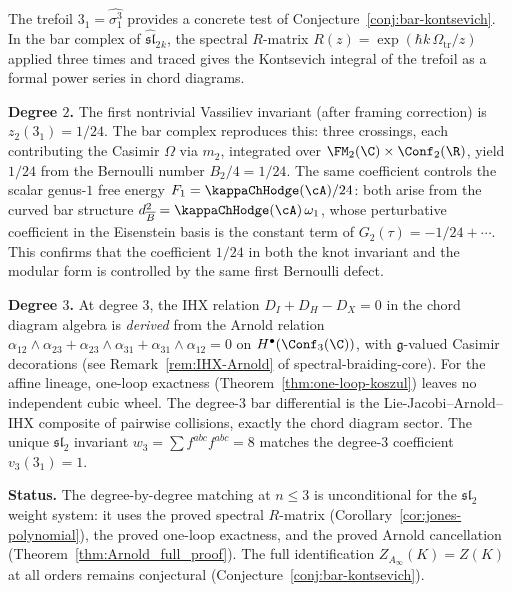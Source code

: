 \begin{example}
\label{ex:trefoil-verification}
The trefoil $3_1 = \widehat{\sigma_1^3}$ provides a
concrete test of Conjecture~\ref{conj:bar-kontsevich}.
In the bar complex of $\widehat{\mathfrak{sl}}_2{}_k$,
the spectral $R$-matrix
$R(z) = \exp(\hbar k\,\Omega_{\mathrm{tr}}/z)$
applied three times and traced gives the
Kontsevich integral of the trefoil as a formal
power series in chord diagrams.

\medskip
\noindent\textbf{Degree $2$.}
The first nontrivial Vassiliev invariant (after framing
correction) is $z_2(3_1) = 1/24$. The bar complex
reproduces this: three crossings, each contributing the
Casimir $\Omega$ via $m_2$, integrated over
$\FM_2(\C) \times \Conf_2(\R)$, yield $1/24$ from
the Bernoulli number $B_2/4 = 1/24$. The same coefficient
controls the scalar genus-$1$ free energy
$F_1 = \kappaChHodge(\cA)/24$:
both arise from the curved bar structure
$d_{\overline{B}}^2 = \kappaChHodge(\cA)\,\omega_1$,
whose perturbative coefficient in the Eisenstein basis is
the constant term of $G_2(\tau) = -1/24 + \cdots$.
This confirms that the coefficient $1/24$ in both the
knot invariant and the modular form is controlled by the
same first Bernoulli defect.

\medskip
\noindent\textbf{Degree $3$.}
At degree $3$, the IHX relation
$D_I + D_H - D_X = 0$ in the chord diagram algebra
is \emph{derived} from the Arnold relation
$\alpha_{12} \wedge \alpha_{23}
+ \alpha_{23} \wedge \alpha_{31}
+ \alpha_{31} \wedge \alpha_{12} = 0$
on $H^\bullet(\Conf_3(\C))$, with $\mathfrak{g}$-valued
Casimir decorations (see Remark~\ref{rem:IHX-Arnold} of
spectral-braiding-core). For the affine lineage,
one-loop exactness (Theorem~\ref{thm:one-loop-koszul})
leaves no independent cubic wheel. The degree-$3$ bar differential
is the Lie-Jacobi--Arnold--IHX composite of pairwise collisions,
exactly the chord diagram sector. The unique $\mathfrak{sl}_2$ invariant
$w_3 = \sum f^{abc}f^{abc} = 8$ matches the degree-$3$
coefficient $v_3(3_1) = 1$.

\medskip
\noindent\textbf{Status.}
The degree-by-degree matching at $n \le 3$ is unconditional
for the $\mathfrak{sl}_2$ weight system: it uses the proved
spectral $R$-matrix
(Corollary~\ref{cor:jones-polynomial}), the proved one-loop
exactness, and the proved Arnold cancellation
(Theorem~\ref{thm:Arnold_full_proof}). The full
identification $Z_{A_\infty}(K) = Z(K)$ at all orders
remains conjectural (Conjecture~\ref{conj:bar-kontsevich}).
\end{example}

